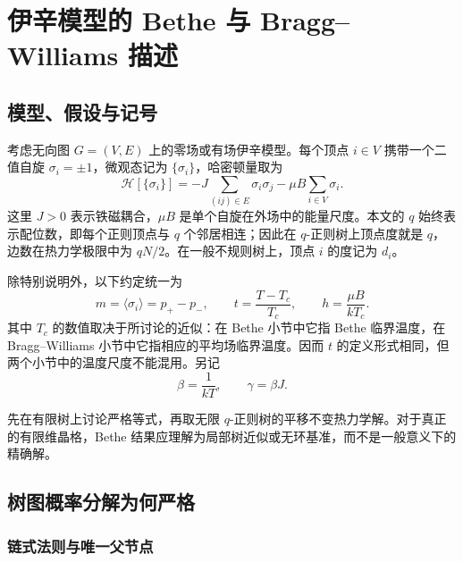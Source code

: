 \section{伊辛模型的 Bethe 与 Bragg--Williams 描述}

\subsection{模型、假设与记号}

考虑无向图 \(G=(V,E)\) 上的零场或有场伊辛模型。每个顶点 \(i\in V\) 携带一个二值自旋
\(\sigma_i=\pm1\)，微观态记为 \(\{\sigma_i\}\)，哈密顿量取为
\begin{equation*}
	\mathcal H[\{\sigma_i\}]
	= -J\sum_{(ij)\in E}\sigma_i\sigma_j-\mu B\sum_{i\in V}\sigma_i .
\end{equation*}
这里 \(J>0\) 表示铁磁耦合，\(\mu B\) 是单个自旋在外场中的能量尺度。本文的 \(q\) 始终表示配位数，即每个正则顶点与 \(q\) 个邻居相连；因此在 \(q\)-正则树上顶点度就是 \(q\)，边数在热力学极限中为 \(qN/2\)。在一般不规则树上，顶点 \(i\) 的度记为 \(d_i\)。

除特别说明外，以下约定统一为
\begin{equation*}
	m=\langle\sigma_i\rangle=p_+-p_-,\qquad
t=\frac{T-T_c}{T_c},\qquad
h=\frac{\mu B}{kT_c}.
\end{equation*}
其中 \(T_c\) 的数值取决于所讨论的近似：在 Bethe 小节中它指 Bethe 临界温度，在 Bragg--Williams 小节中它指相应的平均场临界温度。因而 \(t\) 的定义形式相同，但两个小节中的温度尺度不能混用。另记
\begin{equation*}
	\beta=\frac{1}{kT},\qquad \gamma=\beta J.
\end{equation*}

先在有限树上讨论严格等式，再取无限 \(q\)-正则树的平移不变热力学解。对于真正的有限维晶格，Bethe 结果应理解为局部树近似或无环基准，而不是一般意义下的精确解。

\subsection{树图概率分解为何严格}

\subsubsection{链式法则与唯一父节点}

